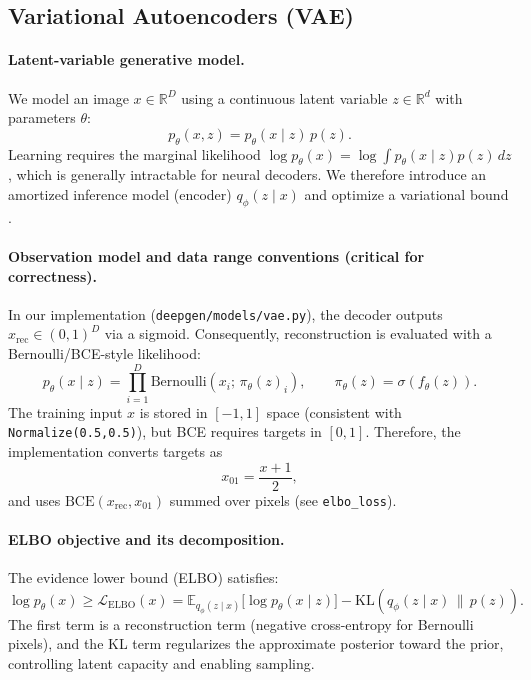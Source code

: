 
\subsection{Variational Autoencoders (VAE)}
\paragraph{Latent-variable generative model.}
We model an image $x \in \mathbb{R}^{D}$ using a continuous latent variable $z \in \mathbb{R}^{d}$ with parameters $\theta$:
\[
p_\theta(x,z)=p_\theta(x\mid z)\,p(z).
\]
Learning requires the marginal likelihood $\log p_\theta(x)=\log \int p_\theta(x\mid z)p(z)\,dz$, which is generally intractable for neural decoders. We therefore introduce an amortized inference model (encoder) $q_\phi(z\mid x)$ and optimize a variational bound \citep{kingma2014vae,rezende2014stochastic}.

\paragraph{Observation model and data range conventions (critical for correctness).}
In our implementation (\texttt{deepgen/models/vae.py}), the decoder outputs $x_{\mathrm{rec}} \in (0,1)^D$ via a sigmoid. Consequently, reconstruction is evaluated with a Bernoulli/BCE-style likelihood:
\[
p_\theta(x\mid z)=\prod_{i=1}^{D}\mathrm{Bernoulli}\!\left(x_i;\,\pi_\theta(z)_i\right),\qquad \pi_\theta(z)=\sigma(f_\theta(z)).
\]
The training input $x$ is stored in $[-1,1]$ space (consistent with \texttt{Normalize(0.5,0.5)}), but BCE requires targets in $[0,1]$. Therefore, the implementation converts targets as
\[
x_{01}=\frac{x+1}{2},
\]
and uses $\mathrm{BCE}(x_{\mathrm{rec}},x_{01})$ summed over pixels (see \texttt{elbo\_loss}).

\paragraph{ELBO objective and its decomposition.}
The evidence lower bound (ELBO) satisfies:
\[
\log p_\theta(x)\ge \mathcal{L}_{\mathrm{ELBO}}(x)
=
\mathbb{E}_{q_\phi(z\mid x)}\big[\log p_\theta(x\mid z)\big]
-
\mathrm{KL}\!\left(q_\phi(z\mid x)\,\|\,p(z)\right).
\]
The first term is a reconstruction term (negative cross-entropy for Bernoulli pixels), and the KL term regularizes the approximate posterior toward the prior, controlling latent capacity and enabling sampling.

